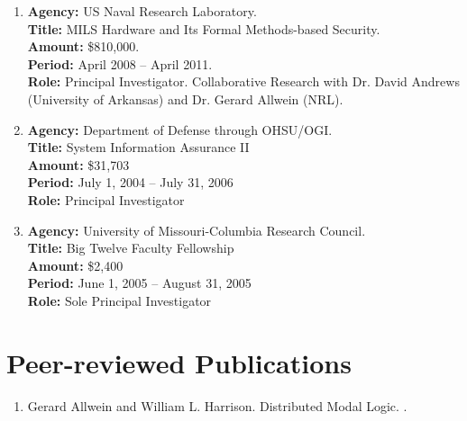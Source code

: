 \documentclass[11pt]{article}
\begin{document}
\begin{enumerate}[leftmargin=0.0mm,resume]
\item
{\bf Agency:} US Naval Research Laboratory.
\\
{\bf Title:} MILS Hardware and Its Formal Methods-based Security.
\\
{\bf Amount:} \$810,000.
\\
{\bf Period:}   April 2008  --  April 2011.
\\
{\bf Role:}      Principal Investigator. Collaborative Research with Dr. David Andrews (University of Arkansas) and Dr. Gerard Allwein (NRL).


\item
{\bf Agency:} Department of Defense through OHSU/OGI.
\\
{\bf Title:} System Information Assurance II
\\
{\bf Amount:} \$31,703 
\\
{\bf Period:}   July 1, 2004  --  July 31, 2006
\\
{\bf Role:}      Principal Investigator

\item
{\bf Agency:} University of Missouri-Columbia Research Council.
\\
{\bf Title:} Big Twelve Faculty Fellowship
\\
{\bf Amount:} \$2,400
\\
{\bf Period:}   June 1, 2005  --  August 31, 2005 
\\
{\bf Role:}      Sole Principal Investigator
\end{enumerate}

\newpage
\section{Peer-reviewed Publications}


\begin{enumerate}[leftmargin=0.0mm]
\item
Gerard Allwein and William L. Harrison.
\newblock Distributed Modal Logic.
.

\end{enumerate}

\end{document}
